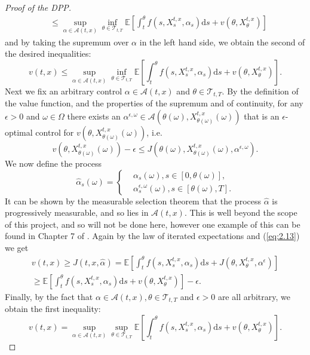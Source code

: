 \begin{proof}[Proof of the DPP]
\begin{align*}
        &\leq\sup_{\alpha\in\mathcal{A}(t,x)}\inf_{\theta\in\mathcal{T}_{t,T}}\mathbb{E}\left[\int_t^\theta f(s,X_s^{t,x},\alpha_s)\mathrm ds+v(\theta,X_\theta^{t,x})\right]
    \end{align*}
    and by taking the supremum over $\alpha$ in the left hand side, we obtain the second
    of the desired inequalities:
    \begin{equation}
        v(t,x)\leq\sup_{\alpha\in\mathcal{A}(t,x)}\inf_{\theta\in\mathcal{T}_{t,T}}\mathbb{E}\left[\int_t^\theta f(s,X_s^{t,x},\alpha_s)\mathrm ds+v(\theta,X_\theta^{t,x})\right].
    \end{equation}
    Next we fix an arbitrary control $\alpha\in\mathcal{A}(t,x)$ and $\theta\in\mathcal{T}_{t,T}.$
    By the definition of the value function, and the properties of the supremum and 
    of continuity, for any $\epsilon>0$ and $\omega\in\Omega$
    there exists an $\alpha^{\epsilon,\omega}\in\mathcal{A}(\theta(\omega),X_{\theta(\omega)}^{t,x}(\omega))$
    that is an $\epsilon$-optimal control for $v(\theta,X_{\theta(\omega)}^{t,x}(\omega))$, i.e.
    \begin{equation}\label{eq:2.13}
        v(\theta,X_{\theta(\omega)}^{t,x}(\omega))-\epsilon \leq J(\theta(\omega),X_{\theta(\omega)}^{t,x}(\omega),\alpha^{\epsilon,\omega}).
    \end{equation}
    We now define the process
    \begin{equation}
        \hat{\alpha}_s(\omega)=\begin{cases}
            &\alpha_s(\omega), s\in[0,\theta(\omega)],\\
            &\alpha_s^{\epsilon,\omega}(\omega),s\in[\theta(\omega),T].
        \end{cases}
    \end{equation}
    It can be shown by the measurable selection theorem that the process 
    $\hat{\alpha}$ is progressively measurable, and so lies in $\mathcal{A}(t,x)$.
    This is well beyond the scope of this project, and so will not be done here, 
    however one example of this can be found in Chapter 7 of \cite{BeSh78}.
    Again by the law of iterated expectations and (\ref{eq:2.13}) we get 
    \begin{align*}
        v(t,x)\geq J(t,x,\hat{\alpha})=\mathbb{E}\left[\int_t^\theta f(s,X_s^{t,x},\alpha_s)\mathrm ds+J(\theta,X_\theta^{t,x},\alpha^\epsilon)\right]\\
        \geq\mathbb{E}\left[\int_t^\theta f(s,X_s^{t,x},\alpha_s)\mathrm ds+v(\theta,X_\theta^{t,x})\right]-\epsilon.
    \end{align*}
    Finally, by the fact that $\alpha\in\mathcal{A}(t,x),\theta\in\mathcal{T}_{t,T}$
    and $\epsilon>0$ are all arbitrary, we obtain the first inequality:
    \begin{equation}
        v(t,x)=\sup_{\alpha\in\mathcal{A}(t,x)}\sup_{\theta\in\mathcal{T}_{t,T}}\mathbb{E}\left[\int_{t}^\theta f(s,X_s^{t,x},\alpha_s)\mathrm ds+v(\theta,X_\theta^{t,x})\right].
    \end{equation}
\end{proof}

